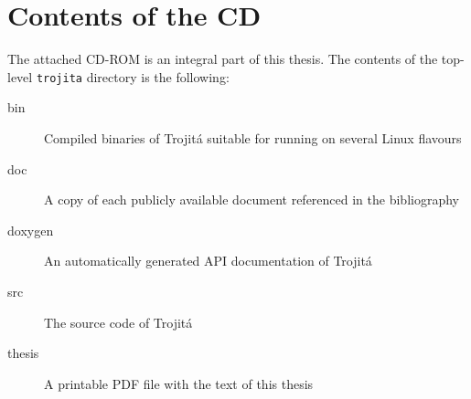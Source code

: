 \documentclass[trojita]{subfiles}
\begin{document}
\chapter{Contents of the CD}
\label{cd-content}


The attached CD-ROM is an integral part of this thesis.  The contents of the
top-level {\tt trojita} directory is the following:

\begin{description}
    \item[bin] Compiled binaries of Trojitá suitable for running on several
        Linux flavours
    \item[doc] A copy of each publicly available document referenced in the
        bibliography
    \item[doxygen] An automatically generated API documentation of Trojitá
    \item[src] The source code of Trojitá
    \item[thesis] A printable PDF file with the text of this thesis
\end{description}
\end{document}
